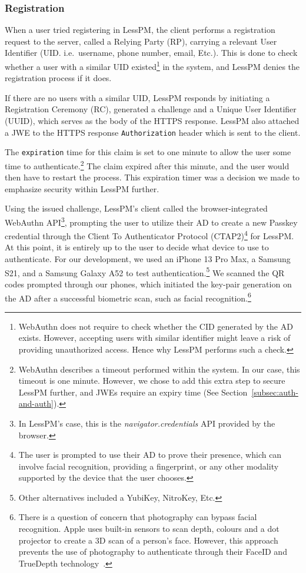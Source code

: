 \subsubsection{Registration}\label{subsubsec:metho-registration}
When a user tried registering in LessPM, the client performs a
registration request to the server, called a Relying Party (RP), carrying a
relevant User Identifier (UID. i.e.\ username, phone number, email, Etc.).
This is done to check whether a user with a similar UID existed\footnote{
  WebAuthn does not require to check whether the CID generated by the AD exists.
  However, accepting users with similar identifier might leave a risk of
  providing unauthorized access.
  Hence why LessPM performs such a check.
} in the system, and LessPM denies the registration process if it does.

If there are no users with a similar UID, LessPM responds by initiating a
Registration Ceremony (RC), generated a challenge and a Unique User
Identifier (UUID), which serves as the body of the HTTPS response.
LessPM also attached a JWE to the HTTPS response \texttt{Authorization} header
which is sent to the client.

The \texttt{expiration} time for this claim is set to one minute to allow the
user some time to authenticate.\footnote{
  WebAuthn describes a timeout performed within the system. In our case, this
  timeout is one minute.
  However, we chose to add this extra step to secure LessPM further, and
  JWEs require an expiry time (See Section~\ref{subsec:auth-and-auth}).
}
The claim expired after this minute, and the user would then have to restart the
process.
This expiration timer was a decision we made to emphasize security within LessPM
further.

Using the issued challenge, LessPM's client called the browser-integrated
WebAuthn API\footnote{
  In LessPM's case, this is the \textit{navigator.credentials} API provided by
  the browser.
}, prompting the user to utilize their AD to create a new Passkey credential
through the Client To Authenticator Protocol (CTAP2)\footnote{
  The user is prompted to use their AD to prove their presence, which can
  involve facial recognition, providing a fingerprint, or any other modality
  supported by the device that the user chooses.
} for
LessPM\@.
At this point, it is entirely up to the user to decide what device to use to
authenticate.
For our development, we used an iPhone 13 Pro Max, a Samsung S21, and a
Samsung Galaxy A52 to test authentication.\footnote{
  Other alternatives included a YubiKey, NitroKey, Etc.
}
We scanned the QR codes prompted through our phones, which initiated the
key-pair generation on the AD after a successful biometric scan, such as
facial recognition.\footnote{
  There is a question of concern that photography can bypass facial recognition.
  Apple uses built-in sensors to scan depth, colours and a dot projector to
  create a 3D scan of a person's face.
  However, this approach prevents the use of photography to authenticate through
  their FaceID and TrueDepth technology~\cite{apple-support}.
}

